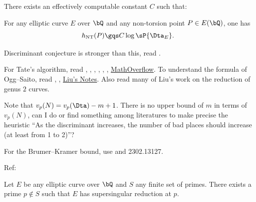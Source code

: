 \documentclass[a4paper, twoside]{article}
\begin{document}
\begin{cnj}[Lang]
	There exists an effectively computable constant $C$ such that:

	For any elliptic curve $E$ over $\bQ$ and any non-torsion point $P\in E(\bQ)$, one has
	\[
		h_{\text{NT}}(P)\gqs C\log\sP{\Dta_{E}}.
	\]
\end{cnj}

\begin{rmk}
	Discriminant conjecture is stronger than this, read \cite{HS1988}.
\end{rmk}


For Tate's algorithm, read \cite{Tate1975}, \cite[Page~365]{Silverman1994}, \cite{Liu2002}, \cite{Lorenzini2010}, \cite{Szydlo1999}, \cite{Szydlo2004}, \href{https://mathoverflow.net/questions/127908/reduction-types-of-elliptic-curves}{MathOverflow}. To understand the formula of Ogg--Saito, read \cite{Ogg1967}, \cite{Saito1988Noether}, \href{https://www.math.u-bordeaux.fr/~qliu/Notes/Ogg-Saito.pdf}{Liu's Notes}. Also read many of Liu's work on the reduction of genus $2$ curves.

\begin{qst}
	Note that $v_{p}(N)=v_{p}(\Dta)-m+1$. There is no upper bound of $m$ in terms of $v_{p}(N)$, can I do or find something among literatures to make precise the heuristic ``As the discriminant increases, the number of bad places should increase (at least from 1 to 2)''?
\end{qst}

For the Brumer--Kramer bound, use \cite{BK1994} and 2302.13127.


Ref:~\cite{Gross1982Minimal,Silverman1984}



\begin{thm}
	Let $E$ be any elliptic curve over $\bQ$ and $S$ any finite set of primes. There exists a prime $p\nin S$ such that $E$ has supersingular reduction at $p$.
\end{thm}
\end{document}
